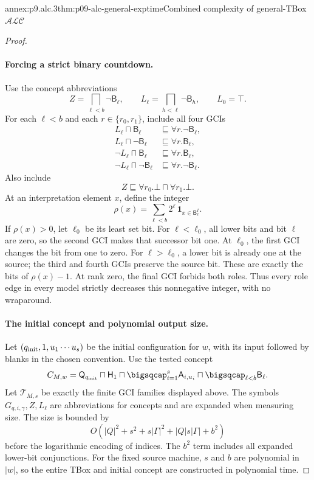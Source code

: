 \begin{annexitem}{annex:p9.alc.3}{thm:p09-alc-general-exptime}{Combined complexity of general-TBox \(\mathcal{ALC}\)}
\begin{proof}
\paragraph{Forcing a strict binary countdown.}
Use the concept abbreviations
\[
 Z=\bigsqcap_{\ell<b}\neg\mathsf B_\ell,\qquad
 L_\ell=\bigsqcap_{h<\ell}\neg\mathsf B_h,
 \qquad L_0=\top.
\]
For each \(\ell<b\) and each \(r\in\{r_0,r_1\}\), include all four GCIs
\[
\begin{aligned}
 L_\ell\sqcap\mathsf B_\ell
    &\sqsubseteq\forall r.\neg\mathsf B_\ell,\\
 L_\ell\sqcap\neg\mathsf B_\ell
    &\sqsubseteq\forall r.\mathsf B_\ell,\\
 \neg L_\ell\sqcap\mathsf B_\ell
    &\sqsubseteq\forall r.\mathsf B_\ell,\\
 \neg L_\ell\sqcap\neg\mathsf B_\ell
    &\sqsubseteq\forall r.\neg\mathsf B_\ell.
\end{aligned}
\]
Also include
\[
 Z\sqsubseteq\forall r_0.\bot\sqcap\forall r_1.\bot.
\]
At an interpretation element \(x\), define the integer
\[
 \rho(x)=\sum_{\ell<b}2^\ell\,
                    \mathbf 1_{x\in\mathsf B_\ell^I}.
\]
If \(\rho(x)>0\), let \(\ell_0\) be its least set bit.
For \(\ell<\ell_0\), all lower bits and bit \(\ell\) are zero,
so the second GCI makes that successor bit one.
At \(\ell_0\), the first GCI changes the bit from one to zero.
For \(\ell>\ell_0\), a lower bit is already one at the source;
the third and fourth GCIs preserve the source bit.
These are exactly the bits of \(\rho(x)-1\).
At rank zero, the final GCI forbids both roles.
Thus every role edge in every model strictly decreases this
nonnegative integer, with no wraparound.

\paragraph{The initial concept and polynomial output size.}
Let \((q_{\rm init},1,u_1\cdots u_s)\) be the initial configuration
for \(w\), with its input followed by blanks in the chosen convention.
Use the tested concept
\[
 C_{M,w}=\mathsf Q_{q_{\rm init}}\sqcap\mathsf H_1
            \sqcap\bigsqcap_{i=1}^{s}\mathsf A_{i,u_i}
            \sqcap\bigsqcap_{\ell<b}\mathsf B_\ell.
\]
Let \(\mathcal T_{M,s}\) be exactly the finite GCI families displayed
above.  The symbols \(G_{q,i,\gamma},Z,L_\ell\) are abbreviations
for concepts and are expanded when measuring size.
The size is bounded by
\[
 O\!\left(|Q|^2+s^2+s|\Gamma|^2
                   +|Q|s|\Gamma|+b^2\right)
\]
before the logarithmic encoding of indices.
The \(b^2\) term includes all expanded lower-bit conjunctions.
For the fixed source machine, \(s\) and \(b\) are polynomial in
\(|w|\), so the entire TBox and initial concept are constructed
in polynomial time.


\end{proof}
\end{annexitem}
